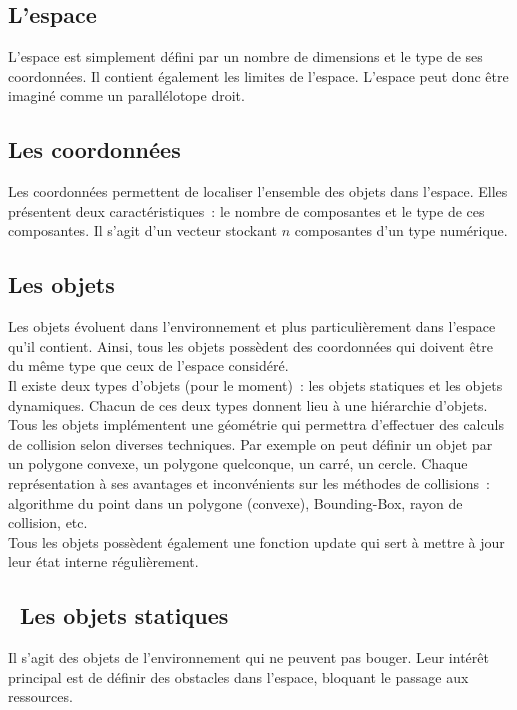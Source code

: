 \subsection{L'espace}

L'espace est simplement défini par un nombre de dimensions et le type de ses coordonnées.
Il contient également les limites de l'espace. L'espace peut donc être imaginé comme un parallélotope droit.

\subsection{Les coordonnées}

Les coordonnées permettent de localiser l'ensemble des objets dans l'espace. Elles présentent deux caractéristiques~: le nombre de composantes et le type de ces composantes. Il s'agit d'un vecteur stockant $n$ composantes d'un type numérique.

\subsection{Les objets}

Les objets évoluent dans l'environnement et plus particulièrement dans l'espace qu'il contient. Ainsi, tous les objets possèdent des coordonnées qui doivent être du même type que ceux de l'espace considéré.\\
\indent Il existe deux types d'objets (pour le moment)~: les objets statiques et les objets dynamiques. Chacun de ces deux types donnent lieu à une hiérarchie d'objets.\\

Tous les objets implémentent une géométrie qui permettra d'effectuer des calculs de collision selon diverses techniques. Par exemple on peut définir un objet par un polygone convexe, un polygone quelconque, un carré, un cercle. Chaque représentation à ses avantages et inconvénients sur les méthodes de collisions~: algorithme du point dans un polygone (convexe), Bounding-Box, rayon de collision, etc.\\

Tous les objets possèdent également une fonction update qui sert à mettre à jour leur état interne régulièrement.

\subsection{\textbullet ~Les objets statiques}

Il s'agit des objets de l'environnement qui ne peuvent pas bouger. Leur intérêt principal est de définir des obstacles dans l'espace, bloquant le passage aux ressources.\\


